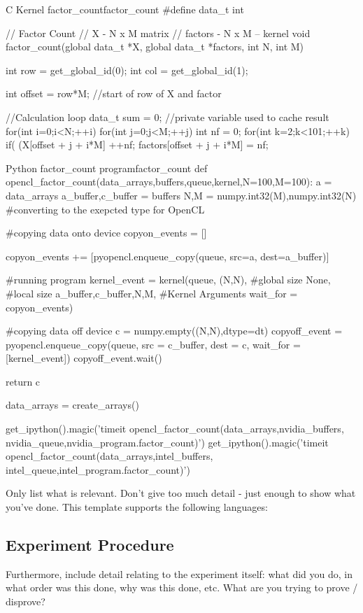 \begin{Cpp}{C Kernel factor_count}{factor_count}
#define data_t int

// Factor Count
// X - N x M matrix
// factors - N x M --
kernel void factor_count(global data_t *X,
global data_t *factors,
int N,
int M)
{
	int row = get_global_id(0);
	int col = get_global_id(1);
	
	int offset = row*M; //start of row of X and factor
	
	//Calculation loop
	data_t sum = 0; //private variable used to cache result
	for(int i=0;i<N;++i) {
		for(int j=0;j<M;++j) {
			int nf = 0;
			for(int k=2;k<101;++k) {
				if( (X[offset + j + i*M] %
				++nf; 
			}
			factors[offset + j + i*M] = nf;
		}
	}
}
	
\end{Cpp}


\begin{Python}{Python factor_count program}{factor_count}
def opencl_factor_count(data_arrays,buffers,queue,kernel,N=100,M=100):
	a = data_arrays
	a_buffer,c_buffer = buffers
	N,M = numpy.int32(M),numpy.int32(N) #converting to the exepcted type for OpenCL
	
	#copying data onto device
	copyon_events = []
	
	copyon_events += [pyopencl.enqueue_copy(queue,
	src=a,
	dest=a_buffer)]
	
	#running program
	kernel_event = kernel(queue,
	(N,N), #global size
	None, #local size 
	a_buffer,c_buffer,N,M, #Kernel Arguments
	wait_for = copyon_events)
	
	
	#copying data off device
	c = numpy.empty((N,N),dtype=dt)
	copyoff_event = pyopencl.enqueue_copy(queue,
	src = c_buffer,
	dest = c,
	wait_for = [kernel_event])
	copyoff_event.wait()
	
	return c

data_arrays = create_arrays()

get_ipython().magic('timeit opencl_factor_count(data_arrays,nvidia_buffers,\\
nvidia_queue,nvidia_program.factor_count)')
get_ipython().magic('timeit opencl_factor_count(data_arrays,intel_buffers,\\
intel_queue,intel_program.factor_count)')

\end{Python}
Only list what is relevant.  Don't give too much detail - just enough to show what you've done.  This template supports the following languages:

  
\subsection{Experiment Procedure}
Furthermore, include detail relating to the experiment itself: what did you do, in what order was this done, why was this done, etc.  What are you trying to prove / disprove?